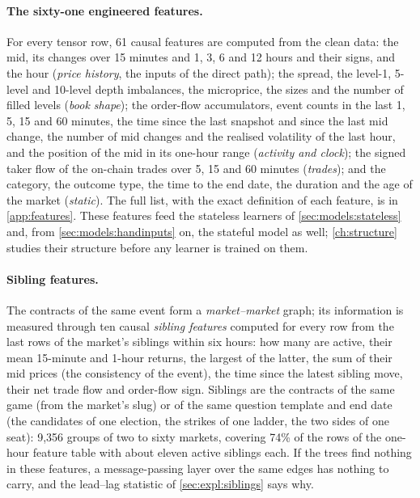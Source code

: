 \paragraph{The sixty-one engineered features.}  For every tensor row, 61 causal features are computed from the clean data: the mid, its changes over
15 minutes and 1, 3, 6 and 12 hours and their signs, and the hour (\emph{price history},
the inputs of the direct path); the spread, the level-1, 5-level and 10-level depth
imbalances, the microprice, the sizes and the number of filled levels (\emph{book
shape}); the order-flow accumulators, event counts in the last 1, 5, 15 and 60 minutes,
the time since the last snapshot and since the last mid change, the number of mid changes
and the realised volatility of the last hour, and the position of the mid in its one-hour
range (\emph{activity and clock}); the signed taker flow of the on-chain trades over 5, 15
and 60 minutes (\emph{trades}); and the category, the outcome type, the time to the end
date, the duration and the age of the market (\emph{static}).  The full list, with
the exact definition of each feature, is in \cref{app:features}.  These features feed the
stateless learners of \cref{sec:models:stateless} and, from \cref{sec:models:handinputs}
on, the stateful model as well; \cref{ch:structure} studies their structure before any
learner is trained on them.

\paragraph{Sibling features.}  The contracts of the same event form a \emph{market--market} graph; its information is
measured through ten causal \emph{sibling features} computed for every row from
the last rows of the market's siblings within six hours: how many are active, their mean
15-minute and 1-hour returns, the largest of the latter, the sum of their mid prices (the
consistency of the event), the time since the latest sibling move, their net trade flow and
order-flow sign.  Siblings are the contracts of the same game (from the market's slug) or of
the same question template and end date (the candidates of one election, the strikes of one
ladder, the two sides of one seat): 9{,}356 groups of two to sixty markets, covering 74\% of
the rows of the one-hour feature table with about eleven active siblings each.  If the trees find nothing in these
features, a message-passing layer over the same edges has nothing to carry, and the
lead--lag statistic of \cref{sec:expl:siblings} says why.


